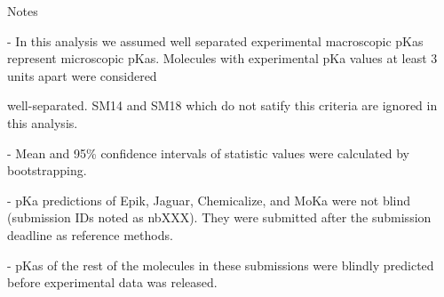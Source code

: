 \documentclass{article}
\begin{document}
Notes

- In this analysis we assumed well separated experimental macroscopic pKas represent microscopic pKas. Molecules with experimental pKa values at least 3 units apart were considered

well-separated. SM14 and SM18 which do not satify this criteria are ignored in this analysis.

- Mean and 95\% confidence intervals of statistic values were calculated by bootstrapping.

- pKa predictions of Epik, Jaguar, Chemicalize, and MoKa were not blind (submission IDs noted as nbXXX). They were submitted after the submission deadline as reference methods.

- pKas of the rest of the molecules in these submissions were blindly predicted before experimental data was released.
\end{document}
